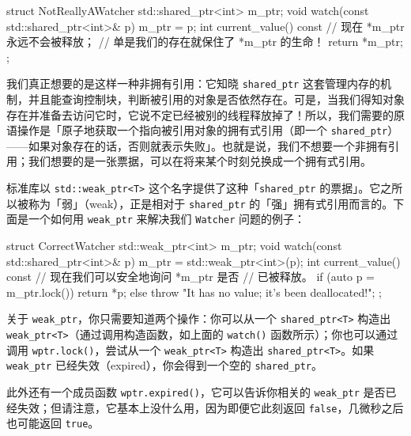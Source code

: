 \begin{codebox}[cpp]
    struct NotReallyAWatcher {
      std::shared_ptr<int> m_ptr;
      void watch(const std::shared_ptr<int>& p) {
        m_ptr = p;
      }
      int current_value() const {
        // 现在 *m_ptr 永远不会被释放；
        // 单是我们的存在就保住了 *m_ptr 的生命！
        return *m_ptr;
      }
    };
\end{codebox}

我们真正想要的是这样一种非拥有引用：它知晓 \texttt{shared\_\allowbreak{}ptr} 这套管理内存的机制，并且能查询控制块，判断被引用的对象是否依然存在。可是，当我们得知对象存在并准备去访问它时，它说不定已经被别的线程释放掉了！所以，我们需要的原语操作是「原子地获取一个指向被引用对象的拥有式引用（即一个 \texttt{shared\_\allowbreak{}ptr}）——如果对象存在的话，否则就表示失败」。也就是说，我们不想要一个非拥有引用；我们想要的是一张票据，可以在将来某个时刻兑换成一个拥有式引用。

标准库以 \texttt{std::\allowbreak{}weak\_\allowbreak{}ptr<\allowbreak{}T>\allowbreak{}} 这个名字提供了这种「\texttt{shared\_\allowbreak{}ptr} 的票据」。它之所以被称为「弱」（weak），正是相对于 \texttt{shared\_\allowbreak{}ptr} 的「强」拥有式引用而言的。下面是一个如何用 \texttt{weak\_\allowbreak{}ptr} 来解决我们 \texttt{Watcher} 问题的例子：

\begin{codebox}[cpp]
    struct CorrectWatcher {
      std::weak_ptr<int> m_ptr;
      void watch(const std::shared_ptr<int>& p) {
        m_ptr = std::weak_ptr<int>(p);
      }
      int current_value() const {
        // 现在我们可以安全地询问 *m_ptr 是否
        // 已被释放。
        if (auto p = m_ptr.lock()) {
            return *p;
        } else {
          throw "It has no value; it's been deallocated!";
        }
      }
    };
\end{codebox}

关于 \texttt{weak\_\allowbreak{}ptr}，你只需要知道两个操作：你可以从一个 \texttt{shared\_\allowbreak{}ptr<\allowbreak{}T>\allowbreak{}} 构造出 \texttt{weak\_\allowbreak{}ptr<\allowbreak{}T>\allowbreak{}}（通过调用构造函数，如上面的 \texttt{watch(\allowbreak{})\allowbreak{}} 函数所示）；你也可以通过调用 \texttt{wptr.\allowbreak{}lock(\allowbreak{})\allowbreak{}}，尝试从一个 \texttt{weak\_\allowbreak{}ptr<\allowbreak{}T>\allowbreak{}} 构造出 \texttt{shared\_\allowbreak{}ptr<\allowbreak{}T>\allowbreak{}}。如果 \texttt{weak\_\allowbreak{}ptr} 已经失效（expired），你会得到一个空的 \texttt{shared\_\allowbreak{}ptr}。

此外还有一个成员函数 \texttt{wptr.\allowbreak{}expired(\allowbreak{})\allowbreak{}}，它可以告诉你相关的 \texttt{weak\_\allowbreak{}ptr} 是否已经失效；但请注意，它基本上没什么用，因为即便它此刻返回 \texttt{false}，几微秒之后也可能返回 \texttt{true}。

